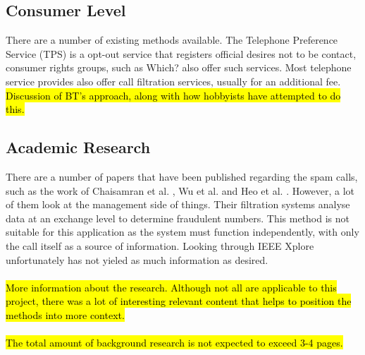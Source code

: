 \documentclass[main.tex]{subfiles}
\begin{document}
\subsection{Consumer Level}
There are a number of existing methods available. The Telephone Preference Service (TPS) \cite{tps} is a opt-out service that registers official desires not to be contact, consumer rights groups, such as Which? \cite{which} also offer such services. Most telephone service provides also offer call filtration services, usually for an additional fee. \hl{Discussion of BT's approach, along with how hobbyists have attempted to do this.}

\subsection{Academic Research}
There are a number of papers that have been published regarding the spam calls, such as the work of Chaisamran et al. \cite{chaisa}, Wu et al. \cite{wu} and Heo et al. \cite{heo}. However, a lot of them look at the management side of things. Their filtration systems analyse data at an exchange level to determine fraudulent numbers. This method is not suitable for this application as the system must function independently, with only the call itself as a source of information. Looking through IEEE Xplore unfortunately has not yieled as much information as desired.
\\\\
\hl{More information about the research. Although not all are applicable to this project, there was a lot of interesting relevant content that helps to position the methods into more context. }
\\\\
\hl{The total amount of background research is not expected to exceed 3-4 pages.}
\end{document}
